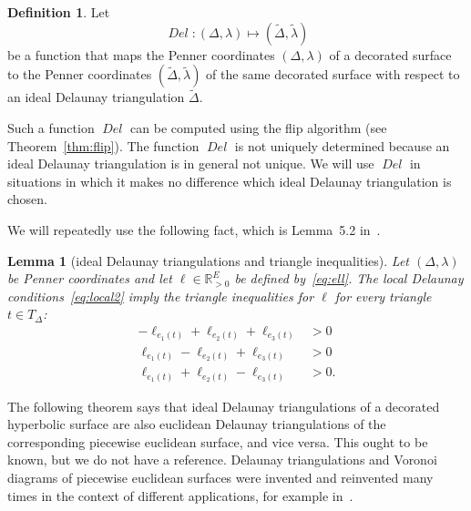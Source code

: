 \documentclass[a4paper, 11pt]{article}
\newcommand{\R}{\mathbb{R}}
\newcommand{\Deltil}{\widetilde{\Delta}}
\newcommand{\lamtil}{\tilde{\lambda}}
\newcommand{\Del}{\operatorname{\textit{Del}}}
\theoremstyle{plain}
\newtheorem{lemma}[theorem]{Lemma}
\theoremstyle{definition}
\newtheorem{definition}[theorem]{Definition}
\begin{document}
\begin{definition}
  \label{def:Del}
  Let
  \begin{equation*}
    \Del:(\Delta,\lambda)\longmapsto (\Deltil,\lamtil)
  \end{equation*}
  be a function that maps the Penner coordinates $(\Delta,\lambda)$
  of a decorated surface to the Penner coordinates
  $(\Deltil,\lamtil)$ of the same decorated surface with respect to an 
  ideal Delaunay triangulation $\Deltil$.
\end{definition}

Such a function $\Del$ can be computed using the flip algorithm
(see Theorem~\ref{thm:flip}). The function $\Del$ is not uniquely
determined because an ideal Delaunay triangulation is in general
not unique. We will use $\Del$ in situations in which
it makes no difference which ideal Delaunay triangulation is chosen.

We will repeatedly use the following fact, which is Lemma~5.2
in~\cite{penner87}.

\begin{lemma}[ideal Delaunay triangulations and triangle inequalities]
  \label{lem:triang}
  Let $(\Delta,\lambda)$ be Penner coordinates and let
  $\ell\in\R_{>0}^{E}$ be defined by~\eqref{eq:ell}. The local
  Delaunay conditions~\eqref{eq:local2} imply the triangle
  inequalities for $\ell$ for every triangle $t\in T_{\Delta}$:
    \begin{equation}
      \label{eq:triang}
      \begin{split}
        -\ell_{e_{1}(t)}+\ell_{e_{2}(t)}+\ell_{e_{3}(t)}&>0\\
        \ell_{e_{1}(t)}-\ell_{e_{2}(t)}+\ell_{e_{3}(t)}&>0\\
        \ell_{e_{1}(t)}+\ell_{e_{2}(t)}-\ell_{e_{3}(t)}&>0.
      \end{split}
    \end{equation}
\end{lemma}

The following theorem says that ideal Delaunay triangulations of a
decorated hyperbolic surface are also euclidean Delaunay
triangulations of the corresponding piecewise euclidean surface, and
vice versa. This ought to be known, but we do not have a
reference. Delaunay triangulations and Voronoi diagrams of piecewise
euclidean surfaces were invented and reinvented many times in the
context of different applications, for example
in~\cite{bobenko07,indermitte01,masur91,thurston98}.
\end{document}
